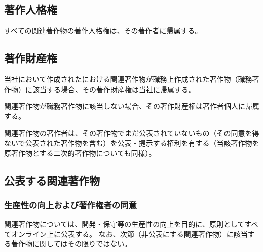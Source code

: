 \subsection{著作人格権}
すべての関連著作物の著作人格権は、その著作者に帰属する。


\subsection{著作財産権}
当社において作成された\DMname における関連著作物が職務上作成された著作物（職務著作物）に該当する場合、その著作財産権は当社に帰属する。

関連著作物が職務著作物に該当しない場合、その著作財産権は著作者個人に帰属する。



\clearpage
関連著作物の著作者は、その著作物でまだ公表されていないもの（その同意を得ないで公表された著作物を含む）を公表・提示する権利を有する（当該著作物を原著作物とする二次的著作物についても同様）。


\subsection{公表する関連著作物}

\subsubsection{生産性の向上および著作権者の同意}
関連著作物については、開発・保守等の生産性の向上を目的に、原則としてすべてオンライン上に公表する。
なお、次節（非公表にする関連著作物）に該当する著作物に関してはその限りではない。

